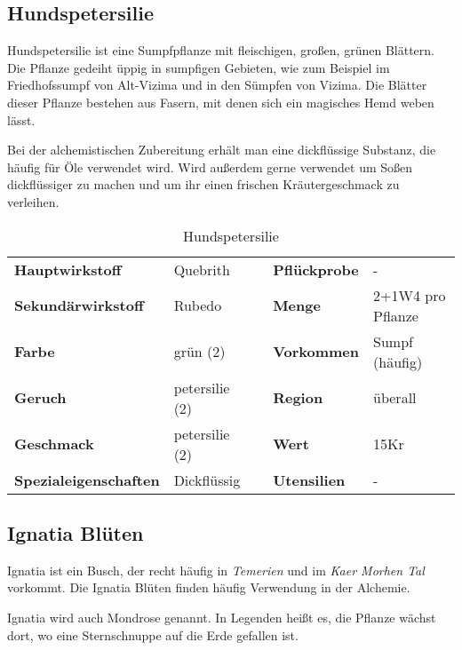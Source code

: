 \subsection{Hundspetersilie}
Hundspetersilie ist eine Sumpfpflanze mit fleischigen, großen, grünen Blättern. Die Pflanze gedeiht üppig in sumpfigen Gebieten, wie zum Beispiel im Friedhofssumpf von Alt-Vizima und in den Sümpfen von Vizima. Die Blätter dieser Pflanze bestehen aus Fasern, mit denen sich ein magisches Hemd weben lässt. 

Bei der alchemistischen Zubereitung erhält man eine dickflüssige Substanz, die häufig für Öle verwendet wird. Wird außerdem gerne verwendet um Soßen dickflüssiger zu machen und um ihr einen frischen Kräutergeschmack zu verleihen.
\newpage
\begin{table}[h] 
\begin{center} 
\begin{tabular}{|l|l|p{1cm}|l|l|} 
  	\cline{1-2} \cline{4-5} 
  	\textbf{Hauptwirkstoff} & Quebrith && \textbf{Pflückprobe} & - \\ \cline{1-2} \cline{4-5} 
  	\textbf{Sekundärwirkstoff} & Rubedo && \textbf{Menge} & 2+1W4 pro Pflanze \\ \cline{1-2} \cline{4-5} 
  	\textbf{Farbe} & grün (2) && \textbf{Vorkommen} & Sumpf (häufig) \\ \cline{1-2} \cline{4-5} 
  	\textbf{Geruch} & petersilie (2) && \textbf{Region} & überall \\ \cline{1-2} \cline{4-5} 
  	\textbf{Geschmack} & petersilie (2) && \textbf{Wert} & 15Kr \\ \cline{1-2} \cline{4-5} 
  	\textbf{Spezialeigenschaften} & Dickflüssig && \textbf{Utensilien} & - \\ \cline{1-2} \cline{4-5} 
\end{tabular} 
\end{center} 
\caption{Hundspetersilie} 
\label{tab:hundspetersilie} 
\end{table}

\subsection{Ignatia Blüten}
Ignatia ist ein Busch, der recht häufig in \textit{Temerien} und im \textit{Kaer Morhen Tal} vorkommt. Die Ignatia Blüten finden häufig Verwendung in der Alchemie.

Ignatia wird auch Mondrose genannt. In Legenden heißt es, die Pflanze wächst dort, wo eine Sternschnuppe auf die Erde gefallen ist.

